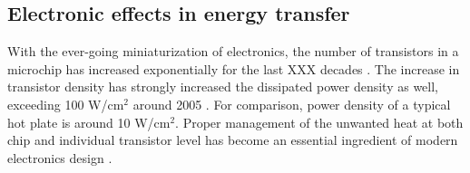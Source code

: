 


\subsection{Electronic effects in energy transfer}
\label{sec:intro_electrons}

With the ever-going miniaturization of electronics, the number of transistors in a microchip has increased exponentially for the last XXX decades \cite{}. The increase in transistor density has strongly increased the dissipated power density as well, exceeding 100 W/cm$^2$ around 2005 \cite{pop10}. For comparison, power density of a typical hot plate is around 10 W/cm$^2$. Proper management of the unwanted heat at both chip and individual transistor level has become an essential ingredient of modern electronics design \cite{pop06_ieee}.

